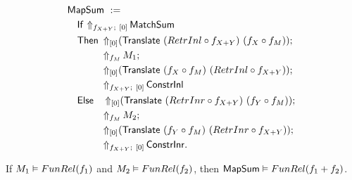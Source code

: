 \begin{definition}[$\MS{MapSum}$]
  \label{def:MapSum}
  ~
  \begin{align*}
    & \MS{MapSum}~:= \\
    &\quad \MS{If}~{\LiftBoth{\MS{MatchSum}}{f_{X+Y}}{\Vector{0}}} \\
    &\quad \MS{Then}~ \LiftTapes{(\MS{Translate}~(RetrInl \circ f_{X+Y})~(f_X \circ f_M))}{\Vector{0}} \Seq \\
    &\quad \phantom{\MS{Then}}~ \LiftAlphabet{M_1}{f_M} \Seq \\
    &\quad \phantom{\MS{Then}}~ \LiftTapes{(\MS{Translate}~(f_X \circ f_M)~(RetrInl \circ f_{X+Y}))}{\Vector{0}} \Seq \\
    &\quad \phantom{\MS{Then}}~ \LiftBoth{\MS{ConstrInl}}{f_{X+Y}}{\Vector{0}} \\
    &\quad \MS{Else}~~~ \LiftTapes{(\MS{Translate}~(RetrInr \circ f_{X+Y})~(f_Y \circ f_M))}{\Vector{0}} \Seq \\
    &\quad \phantom{\MS{Then}}~ \LiftAlphabet{M_2}{f_M} \Seq \\
    &\quad \phantom{\MS{Then}}~ \LiftTapes{(\MS{Translate}~(f_Y \circ f_M)~(RetrInr \circ f_{X+Y}))}{\Vector{0}} \Seq \\
    &\quad \phantom{\MS{Then}}~ \LiftBoth{\MS{ConstrInr}}{f_{X+Y}}{\Vector{0}}.
  \end{align*}

\end{definition}

\begin{lemma}
  \label{lem:MapSum_Computes}
  If $M_1 \mathrel{\vDash} FunRel(f_1)$ and $M_2 \mathrel{\vDash} FunRel(f_2)$, then $\mathsf{MapSum} \mathrel{\vDash} FunRel(f_1+f_2)$.
\end{lemma}


